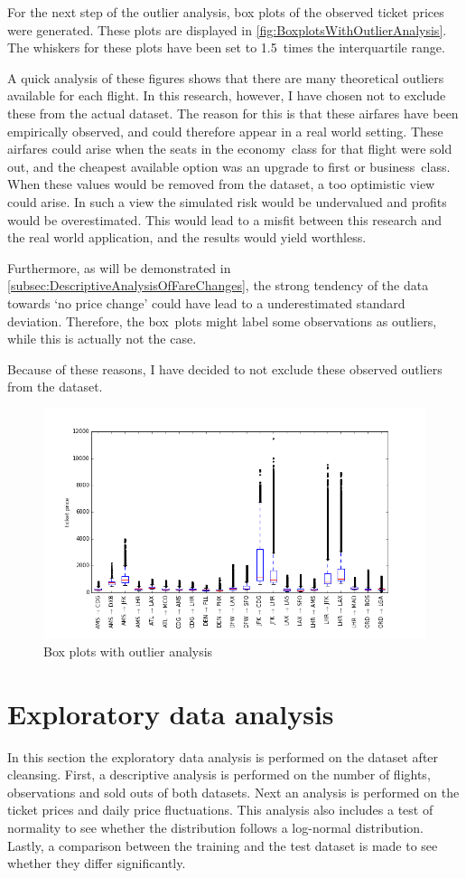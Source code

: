 For the next step of the outlier analysis, box plots of the observed ticket prices were generated. These plots are displayed in \autoref{fig:BoxplotsWithOutlierAnalysis}. The whiskers for these plots have been set to 1.5~times the interquartile range.

A quick analysis of these figures shows that there are many theoretical outliers available for each flight. In this research, however, I have chosen not to exclude these from the actual dataset. The reason for this is that these airfares have been empirically observed, and could therefore appear in a real world setting. These airfares could arise when the seats in the economy~class for that flight were sold out, and the cheapest available option was an upgrade to first or business~class. When these values would be removed from the dataset, a too optimistic view could arise. In such a view the simulated risk would be undervalued and profits would be overestimated. This would lead to a misfit between this research and the real world application, and the results would yield worthless.

Furthermore, as will be demonstrated in \autoref{subsec:DescriptiveAnalysisOfFareChanges}, the strong tendency of the data towards `no price change' could have lead to a underestimated standard deviation. Therefore, the box~plots might label some observations as outliers, while this is actually not the case.

Because of these reasons, I have decided to not exclude these observed outliers from the dataset.


\begin{figure}
\centering
\includegraphics[width=.8\textwidth]{figures/outlierAnalysis}
\caption{Box plots with outlier analysis}
\label{fig:BoxplotsWithOutlierAnalysis}
\end{figure}


\section{Exploratory data analysis}
In this section the exploratory data analysis is performed on the dataset after cleansing. First, a descriptive analysis is performed on the number of flights, observations and sold outs of both datasets. Next an analysis is performed on the ticket prices and daily price fluctuations. This analysis also includes a test of normality to see whether the distribution follows a log-normal distribution. Lastly, a comparison between the training and the test dataset is made to see whether they differ significantly.

